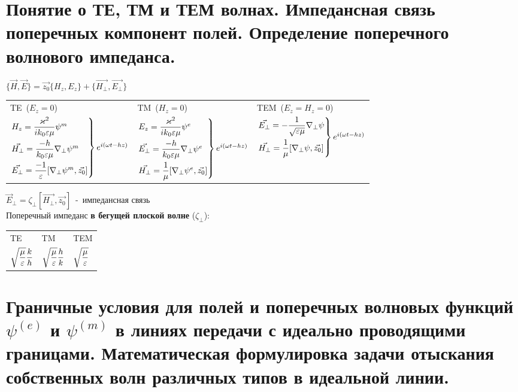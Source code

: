\begin{multicols*}{2}
		\section{Понятие о ТЕ, ТМ и ТЕМ волнах. Импедансная связь поперечных компонент полей. Определение поперечного волнового импеданса. }
		
		$\{\vec{H},\vec{E}\}=\vec{z_0}\{{H_z},{E_z}\}+\{\vec{H_\perp},\vec{E_\perp}\}$ \\
		\begin{tabular}{l l l}
			TE~($E_z=0$) & TM~($H_z=0$) & TEM~($E_z=H_z=0$) \\
			$\begin{rcases}
				H_z=\dfrac{\varkappa^2}{ik_0\varepsilon\mu}\psi^m \\
				\vec{H_\perp} = \dfrac{-h}{k_0\varepsilon\mu}\nabla_\perp\psi^m \\
				\vec{E_\perp}=\dfrac{-1}{\varepsilon}[\nabla_\perp\psi^m,\vec{z_0}]
			\end{rcases} e^{i(\omega t-hz)}$ & 
			$\begin{rcases}
				E_z=\dfrac{\varkappa^2}{ik_0\varepsilon\mu}\psi^e \\
				\vec{E_\perp} = \dfrac{-h}{k_0\varepsilon\mu}\nabla_\perp\psi^e \\
				\vec{H_\perp}=\dfrac1{\mu}[\nabla_\perp\psi^e,\vec{z_0}]
			\end{rcases} e^{i(\omega t-hz)}$ & 
			$\begin{rcases}
				\vec{E_\perp} =-\dfrac1{\sqrt{\varepsilon\mu}}\nabla_\perp\psi \\
				\vec{H_\perp}=\dfrac1{\mu}[\nabla_\perp\psi,\vec{z_0}]
			\end{rcases} e^{i(\omega t-hz)}$ \\
		\end{tabular}
		$\vec{E}_\perp=\zeta_\perp[\vec{H_\perp},\vec{z_0}]$~-~импедансная связь \\
		Поперечный импеданс \textbf{в бегущей плоской волне} ($\zeta_\perp$): \\
		\begin{tabular}{l l l}
			TE & TM & TEM \\
			$\sqrt{\dfrac{\mu}{\varepsilon}}\dfrac kh$ & $\sqrt{\dfrac{\mu}{\varepsilon}}\dfrac hk$ & $\sqrt{\dfrac{\mu}{\varepsilon}}$ \\
		\end{tabular}
		
		\section{Граничные условия для полей и поперечных волновых функций $\psi^{(e)}$ и $\psi^{(m)}$ в линиях передачи с идеально проводящими границами. Математическая формулировка задачи отыскания собственных волн различных типов в идеальной линии.}
		

\end{multicols*}
